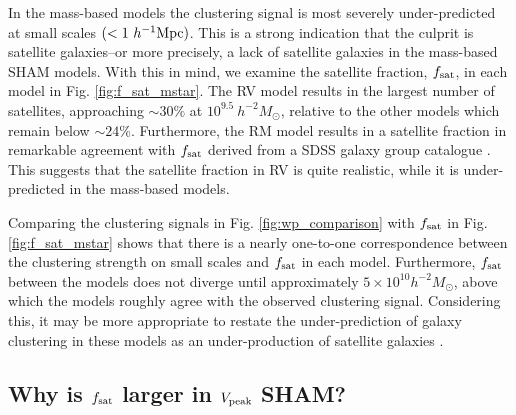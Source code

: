 \documentclass[useAMS,fleqn,usenatbib]{mnras}
\begin{document}
In the mass-based models the clustering signal is most severely under-predicted at small scales $(<1~h^{-1}{\rm Mpc})$.  This is a strong indication that the culprit is satellite galaxies--or more precisely, a lack of satellite galaxies in the mass-based SHAM models.  With this in mind, we examine the satellite fraction, $f_{\rm sat}$, in each model in Fig. \ref{fig:f_sat_mstar}.  The RV model results in the largest number of satellites, approaching $\sim30\%$ at $10^{9.5}~h^{-2}M_{\odot}$, relative to the other models which remain below  $\sim24\%$. Furthermore, the RM model results in a satellite fraction in remarkable agreement with $f_{\rm sat}$ derived from a SDSS galaxy group catalogue \citep{vandenBosch:2008fv}.  This suggests that the satellite fraction in RV is quite realistic, while it is under-predicted in the mass-based models. 

Comparing the clustering signals in Fig. \ref{fig:wp_comparison} with $f_{\rm sat}$ in Fig. \ref{fig:f_sat_mstar} shows that there is a nearly one-to-one correspondence between the clustering strength on small scales and $f_{\rm sat}$ in each model.  Furthermore, $f_{\rm sat}$ between the models does not diverge until approximately $5 \times 10^{10}h^{-2}M_{\odot}$, above which the models roughly agree with the observed clustering signal.  Considering this, it may be more appropriate to restate the under-prediction of galaxy clustering in these models as an under-production of satellite galaxies \citep[][]{Lehmann:2017fy}.

\subsection{Why is $f_{\rm sat}$ larger in $V_{\rm peak}$ SHAM?}
\end{document}
